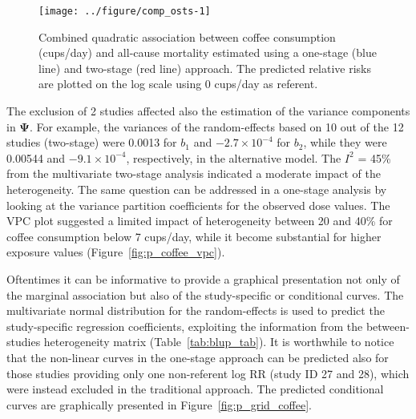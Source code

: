 \documentclass[11pt,a4paper,twoside,openany]{book}\usepackage{knitr}
\begin{document}
{{\begin{knitrout}
\begin{figure}[ht!]
{\centering \texttt{[image: ../figure/comp\_osts-1]} 

}

\caption[Combined quadratic association between coffee consumption (cups/day) and all-cause mortality estimated using a one-stage (blue line) and two-stage (red line) approach]{Combined quadratic association between coffee consumption (cups/day) and all-cause mortality estimated using a one-stage (blue line) and two-stage (red line) approach. The predicted relative risks are plotted on the log scale using 0 cups/day as referent.}\label{fig:comp_osts}
\end{figure}


\end{knitrout}

\noindent The exclusion of 2 studies affected also the estimation of the variance components in $\boldsymbol{\Psi}$. For example, the variances of the random-effects based on 10 out of the 12 studies (two-stage) were 0.0013 for $b_1$ and \ensuremath{-2.7\times 10^{-4}} for $b_2$, while they were 0.00544 and \ensuremath{-9.1\times 10^{-4}}, respectively, in the alternative model. The $I^2$ = 45\% from the multivariate two-stage analysis indicated a moderate impact of the heterogeneity. The same question can be addressed in a one-stage analysis by looking at the variance partition coefficients for the observed dose values. The VPC plot suggested a limited impact of heterogeneity between 20 and 40\% for coffee consumption below 7 cups/day, while it become substantial for higher exposure values (Figure~\ref{fig:p_coffee_vpc}).

Oftentimes it can be informative to provide a graphical presentation not only of the marginal association but also of the study-specific or conditional curves. The multivariate normal distribution for the random-effects is used to predict the study-specific regression coefficients, exploiting the information from the between-studies heterogeneity matrix (Table~\ref{tab:blup_tab}). 
It is worthwhile to notice that the non-linear curves in the one-stage approach can be predicted also for those studies providing only one non-referent log RR (study ID 27 and 28), which were instead excluded in the traditional approach. The predicted conditional curves are graphically presented in Figure~\ref{fig:p_grid_coffee}.

\begin{knitrout}\footnotesize
{}\color{fgcolor}\begin{figure}[ht!]


\end{figure}
\end{knitrout}}}
\end{document}
